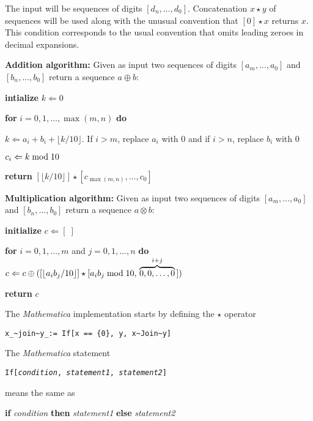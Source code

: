 The input will be sequences of digits $[d_n,\ldots,d_0]$.
Concatenation $x\star y$ of sequences will be used along with the
unusual convention that $[0]\star x$ returns $x$.
This condition corresponds to the usual convention that omits
leading zeroes in decimal expansions.

\medskip\noindent
\begin{boxedtext}
\noindent
{\bf Addition algorithm:} Given as input two sequences of
digits $[a_m,\ldots,a_0]$ and $[b_n,\ldots,b_0]$ return a sequence
$a\oplus b$:

\medskip\noindent
{\bf intialize} $k\Leftarrow 0$

\smallskip\noindent
{\bf for} $i=0,1,\ldots, \max(m,n)$ {\bf do}

\smallskip
$k \Leftarrow a_i + b_i + \lfloor k/10\rfloor$. If $i > m$, replace
$a_i$ with $0$ and if $i> n$, replace $b_i$ with $0$

\smallskip
$c_i \Leftarrow k\; {\rm mod}\; 10$

\smallskip\noindent
{\bf return} $[\lfloor k/10 \rfloor]\star [c_{\max(m,n)},\ldots,c_0]$
\end{boxedtext}

\medskip\noindent 
\begin{boxedtext}
\noindent
{\bf Multiplication algorithm:} Given as input two sequences of
digits $[a_m,\ldots,a_0]$ and $[b_n,\ldots,b_0]$ return a sequence 
$a\otimes b$:

\smallskip\noindent
{\bf initialize} $c \Leftarrow [\;]$ 

\noindent
{\bf for} $i=0,1,\ldots,m$ and $j=0,1,\ldots,n$ 
{\bf do}
$
c \Leftarrow c \oplus 
([\lfloor a_i b_j/10\rfloor]\star [a_ib_j\;{\rm mod}\; 10,
\,\overbrace{0,0,\ldots,0}^{i+j}\,]) 
$

\smallskip\noindent
{\bf return} $c$
\end{boxedtext}


\medskip\noindent
The {\sl Mathematica\/} implementation starts by defining
the $\star$ operator

{\sl 
\begin{verbatim}
x_~join~y_:= If[x == {0}, y, x~Join~y]
\end{verbatim}
}

\noindent
The {\sl Mathematica\/} statement

\smallskip
{\tt If[{\sl condition}, {\sl statement1}, {\sl statement2}]}

\smallskip\noindent
means the same as 

\smallskip
{\bf if} {\sl condition} {\bf then} 
{\sl statement1} {\bf else} {\sl statement2}

